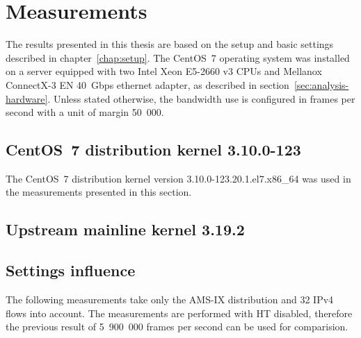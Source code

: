 
\chapter{Measurements}\label{chap:measurements}
The results presented in this thesis are based on the setup and basic settings described in chapter~\ref{chap:setup}.
The CentOS~7 operating system
was installed on a server equipped with two Intel Xeon E5-2660 v3 CPUs
and Mellanox ConnectX-3 EN 40~Gbps ethernet adapter, as described in section~\ref{sec:analysis-hardware}.
Unless stated otherwise,
the bandwidth use is configured in frames per second with a unit of margin 50~000.

\section{CentOS~7 distribution kernel 3.10.0-123}
The CentOS~7 distribution kernel version 3.10.0-123.20.1.el7.x86\_64
was used in the measurements presented in this section.

	
	
	
	
	
	
	
	
	
	
	
	
	
	
	


\section{Upstream mainline kernel 3.19.2}

	
	
	

\section{Settings influence}

	
	
The following measurements take only the AMS-IX distribution and 32 IPv4 flows into account.
The measurements are performed with HT disabled,
therefore the previous result of 5~900~000 frames per second can be used for comparision.

